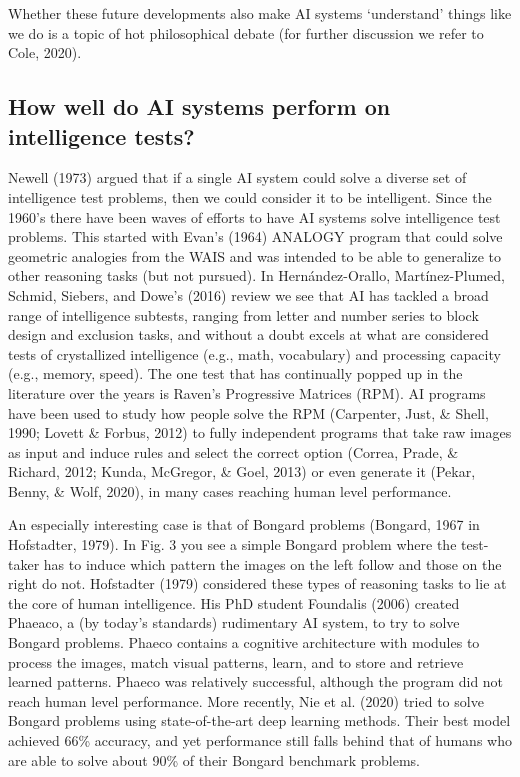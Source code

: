 Whether these future developments also make AI systems `understand'
things like we do is a topic of hot philosophical debate
(for further discussion we refer to Cole, 2020).

\subsection{How well do AI systems perform on intelligence tests?}

Newell (1973) argued that if a single AI system could solve a diverse
set of intelligence test problems, then we could consider it to be
intelligent.
Since the 1960's there have been waves of efforts to have AI systems
solve intelligence test problems.
This started with Evan's (1964) ANALOGY program that could solve
geometric analogies from the WAIS and was intended to be able
to generalize to other reasoning tasks (but not pursued).
In Hernández-Orallo, Martínez-Plumed, Schmid, Siebers, and Dowe's
(2016) review we see that AI has tackled a broad range of intelligence
subtests, ranging from letter and number series to block design and
exclusion tasks, and without a doubt excels at what are considered
tests of crystallized intelligence (e.g., math, vocabulary) and
processing capacity (e.g., memory, speed).
The one test that has continually popped up in the literature
over the years is Raven's Progressive Matrices (RPM).
AI programs have been used to study how people solve the RPM
(Carpenter, Just, \& Shell, 1990; Lovett \& Forbus, 2012) to fully
independent programs that take raw images as input and induce rules
and select the correct option
(Correa, Prade, \& Richard, 2012; Kunda, McGregor, \& Goel, 2013)
or even generate it (Pekar, Benny, \& Wolf, 2020), in many cases
reaching human level performance.

An especially interesting case is that of Bongard problems
(Bongard, 1967 in Hofstadter, 1979).
In Fig. 3 you see a simple Bongard problem where the test-taker has
to induce which pattern the images on the left follow and those
on the right do not.
Hofstadter (1979) considered these types of reasoning tasks to lie
at the core of human intelligence.
His PhD student Foundalis (2006) created Phaeaco, a
(by today's standards) rudimentary AI system, to try to solve
Bongard problems.
Phaeco contains a cognitive architecture with modules to process
the images, match visual patterns, learn, and to store and retrieve
learned patterns.
Phaeco was relatively successful, although the program did not reach
human level performance.
More recently, Nie et al. (2020) tried to solve Bongard problems
using state-of-the-art deep learning methods.
Their best model achieved 66\% accuracy, and yet performance still
falls behind that of humans who are able to solve about 90\% of
their Bongard benchmark problems.

